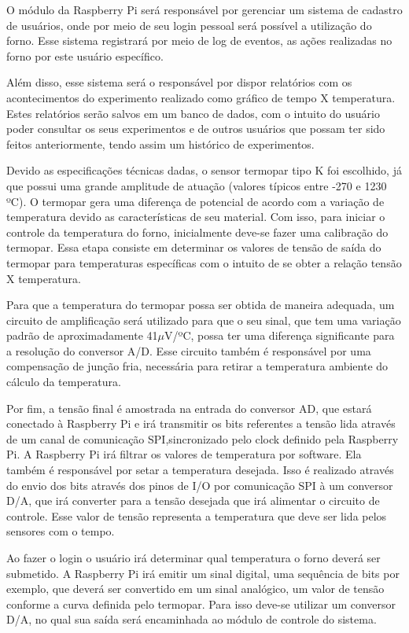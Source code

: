 O módulo da Raspberry Pi será responsável por gerenciar um sistema de cadastro de usuários, onde por meio de seu login pessoal será possível a utilização do forno. Esse sistema registrará por meio de log de eventos, as ações realizadas no forno por este usuário específico.

Além disso, esse sistema será o responsável por dispor relatórios com os acontecimentos do experimento realizado como gráfico de tempo X temperatura. Estes relatórios serão salvos em um banco de dados, com o intuito do usuário poder consultar os seus experimentos e de outros usuários que possam ter sido feitos anteriormente, tendo assim um histórico de experimentos.

Devido as especificações técnicas dadas, o sensor termopar tipo K foi escolhido, já que possui uma grande amplitude de atuação (valores típicos entre -270 e 1230 ºC). O termopar gera uma diferença de potencial de acordo com a variação de temperatura devido as características de seu material. Com isso, para iniciar o controle da temperatura do forno, inicialmente deve-se fazer uma calibração do termopar. Essa etapa consiste em determinar os valores de tensão de saída do termopar para temperaturas específicas com o intuito de se obter a relação tensão X temperatura.

Para que a temperatura do termopar possa ser obtida de maneira adequada, um circuito de amplificação será utilizado para que o seu sinal, que tem uma variação padrão de aproximadamente 41$\mu$V/ºC, possa ter uma diferença significante para a resolução do conversor A/D. Esse circuito também é responsável por uma compensação de junção fria, necessária para retirar a temperatura ambiente do cálculo da temperatura.

Por fim, a tensão final é amostrada na entrada do conversor AD, que estará conectado à Raspberry Pi e irá transmitir os bits referentes a tensão lida através de um canal de comunicação SPI,sincronizado pelo clock definido pela Raspberry Pi. A Raspberry Pi irá filtrar os valores de temperatura por software. Ela também é responsável por setar a temperatura desejada. Isso é realizado através do envio dos bits através dos pinos de I/O por comunicação SPI à um conversor D/A, que irá converter para a tensão desejada que irá alimentar o circuito de controle. Esse valor de tensão representa a temperatura que deve ser lida pelos sensores com o tempo.

Ao fazer o login o usuário irá determinar qual temperatura o forno deverá ser submetido. A Raspberry Pi irá emitir um sinal digital, uma sequência de bits por exemplo, que deverá ser convertido em um sinal analógico, um valor de tensão conforme a curva definida pelo termopar. Para isso deve-se utilizar um conversor D/A, no qual sua saída será encaminhada ao módulo de controle do sistema.

